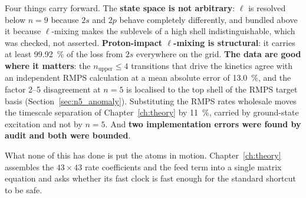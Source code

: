 Four things carry forward. The \textbf{state space is not arbitrary}: $\ell$ is
resolved below $n=9$ because $2s$ and $2p$ behave completely differently, and
bundled above it because $\ell$-mixing makes the sublevels of a high shell
indistinguishable, which was checked, not asserted. \textbf{Proton-impact
$\ell$-mixing is structural}: it carries at least \SI{99.92}{\percent} of the
loss from $2s$ everywhere on the grid. \textbf{The data are good where it
matters}: the $n_{\text{upper}} \le 4$ transitions that drive the kinetics agree
with an independent RMPS calculation at a mean absolute error of
\SI{13.0}{\percent}, and the factor 2--5 disagreement at $n=5$ is localised to
the top shell of the RMPS target basis (Section~\ref{sec:n5_anomaly}).
Substituting the RMPS rates wholesale moves the
timescale separation of Chapter~\ref{ch:theory} by \SI{11}{\percent}, carried
by ground-state excitation and not by $n=5$. And \textbf{two
implementation errors were found by audit and both were bounded}.

What none of this has done is put the atoms in motion. Chapter~\ref{ch:theory}
assembles the $43 \times 43$ rate coefficients and the feed term into a single
matrix equation and asks whether its fast clock is fast enough for the standard
shortcut to be safe.
